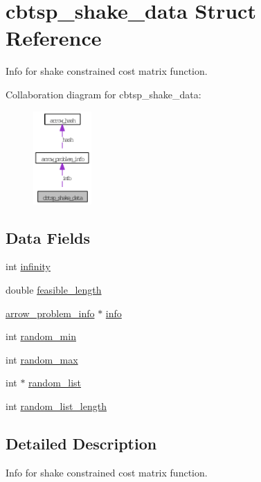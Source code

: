 \hypertarget{structcbtsp__shake__data}{
\section{cbtsp\_\-shake\_\-data Struct Reference}
\label{structcbtsp__shake__data}
}
Info for shake constrained cost matrix function.  


Collaboration diagram for cbtsp\_\-shake\_\-data:\nopagebreak
\begin{figure}[H]
\begin{center}
\leavevmode
\includegraphics[width=63pt]{structcbtsp__shake__data__coll__graph}
\end{center}
\end{figure}
\subsection*{Data Fields}
\begin{CompactItemize}
\item 
int \hyperlink{structcbtsp__shake__data_0027814ba0f0f76f91e7169d0486897f}{infinity}
\item 
double \hyperlink{structcbtsp__shake__data_651c45c37eee045a6bcea8963955edd6}{feasible\_\-length}
\item 
\hyperlink{structarrow__problem__info}{arrow\_\-problem\_\-info} $\ast$ \hyperlink{structcbtsp__shake__data_3d2c2d5951d6245419346509f328720b}{info}
\item 
int \hyperlink{structcbtsp__shake__data_88e2f84442dd2fb0cfdf548de45dd4a2}{random\_\-min}
\item 
int \hyperlink{structcbtsp__shake__data_c60975938eff642adfafd228b666d536}{random\_\-max}
\item 
int $\ast$ \hyperlink{structcbtsp__shake__data_325d0115e7fe18f7fede7e164e6f6d8f}{random\_\-list}
\item 
int \hyperlink{structcbtsp__shake__data_20b4fd190a23a1a0cb3e869716d2af3f}{random\_\-list\_\-length}
\end{CompactItemize}


\subsection{Detailed Description}
Info for shake constrained cost matrix function. 

